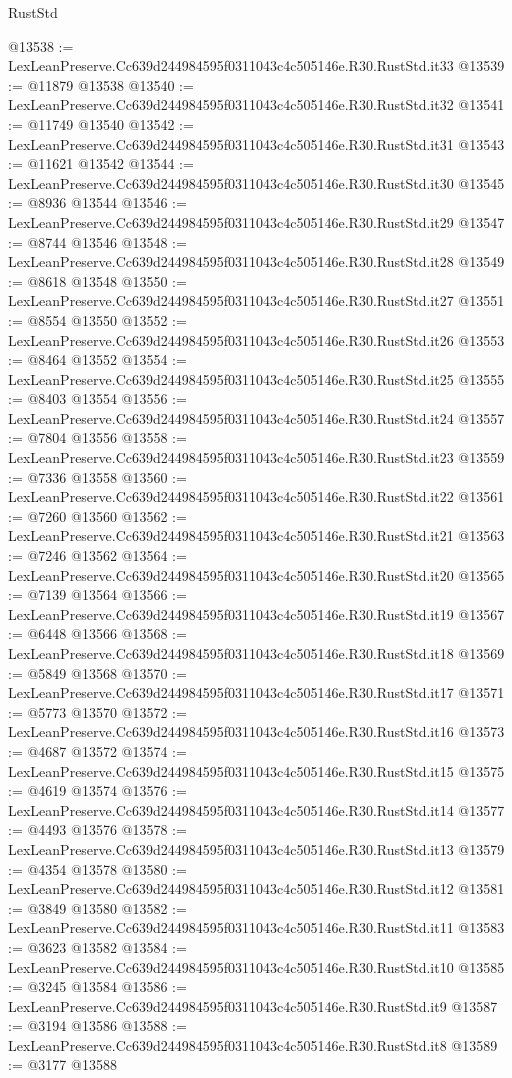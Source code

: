 \begin{lexlean}{RustStd}
\begin{coremodule}
@13538 := LexLeanPreserve.Cc639d244984595f0311043c4c505146e.R30.RustStd.it33
@13539 := @11879 @13538
@13540 := LexLeanPreserve.Cc639d244984595f0311043c4c505146e.R30.RustStd.it32
@13541 := @11749 @13540
@13542 := LexLeanPreserve.Cc639d244984595f0311043c4c505146e.R30.RustStd.it31
@13543 := @11621 @13542
@13544 := LexLeanPreserve.Cc639d244984595f0311043c4c505146e.R30.RustStd.it30
@13545 := @8936 @13544
@13546 := LexLeanPreserve.Cc639d244984595f0311043c4c505146e.R30.RustStd.it29
@13547 := @8744 @13546
@13548 := LexLeanPreserve.Cc639d244984595f0311043c4c505146e.R30.RustStd.it28
@13549 := @8618 @13548
@13550 := LexLeanPreserve.Cc639d244984595f0311043c4c505146e.R30.RustStd.it27
@13551 := @8554 @13550
@13552 := LexLeanPreserve.Cc639d244984595f0311043c4c505146e.R30.RustStd.it26
@13553 := @8464 @13552
@13554 := LexLeanPreserve.Cc639d244984595f0311043c4c505146e.R30.RustStd.it25
@13555 := @8403 @13554
@13556 := LexLeanPreserve.Cc639d244984595f0311043c4c505146e.R30.RustStd.it24
@13557 := @7804 @13556
@13558 := LexLeanPreserve.Cc639d244984595f0311043c4c505146e.R30.RustStd.it23
@13559 := @7336 @13558
@13560 := LexLeanPreserve.Cc639d244984595f0311043c4c505146e.R30.RustStd.it22
@13561 := @7260 @13560
@13562 := LexLeanPreserve.Cc639d244984595f0311043c4c505146e.R30.RustStd.it21
@13563 := @7246 @13562
@13564 := LexLeanPreserve.Cc639d244984595f0311043c4c505146e.R30.RustStd.it20
@13565 := @7139 @13564
@13566 := LexLeanPreserve.Cc639d244984595f0311043c4c505146e.R30.RustStd.it19
@13567 := @6448 @13566
@13568 := LexLeanPreserve.Cc639d244984595f0311043c4c505146e.R30.RustStd.it18
@13569 := @5849 @13568
@13570 := LexLeanPreserve.Cc639d244984595f0311043c4c505146e.R30.RustStd.it17
@13571 := @5773 @13570
@13572 := LexLeanPreserve.Cc639d244984595f0311043c4c505146e.R30.RustStd.it16
@13573 := @4687 @13572
@13574 := LexLeanPreserve.Cc639d244984595f0311043c4c505146e.R30.RustStd.it15
@13575 := @4619 @13574
@13576 := LexLeanPreserve.Cc639d244984595f0311043c4c505146e.R30.RustStd.it14
@13577 := @4493 @13576
@13578 := LexLeanPreserve.Cc639d244984595f0311043c4c505146e.R30.RustStd.it13
@13579 := @4354 @13578
@13580 := LexLeanPreserve.Cc639d244984595f0311043c4c505146e.R30.RustStd.it12
@13581 := @3849 @13580
@13582 := LexLeanPreserve.Cc639d244984595f0311043c4c505146e.R30.RustStd.it11
@13583 := @3623 @13582
@13584 := LexLeanPreserve.Cc639d244984595f0311043c4c505146e.R30.RustStd.it10
@13585 := @3245 @13584
@13586 := LexLeanPreserve.Cc639d244984595f0311043c4c505146e.R30.RustStd.it9
@13587 := @3194 @13586
@13588 := LexLeanPreserve.Cc639d244984595f0311043c4c505146e.R30.RustStd.it8
@13589 := @3177 @13588

\end{coremodule}
\end{lexlean}
